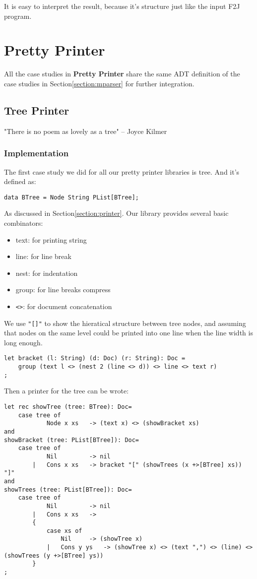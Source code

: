 It is easy to interpret the result, because it's structure just like the input F2J program.

\section{Pretty Printer}

All the case studies in \textbf{Pretty Printer} share the same ADT definition of the case studies in Section\ref{section:mparser} for further integration.

\subsection{Tree Printer}
"There is no poem as lovely as a tree" -- Joyce Kilmer
\subsubsection{Implementation}

The first case study we did for all our pretty printer libraries is tree. And it's defined as:

\begin{lstlisting}
data BTree = Node String PList[BTree];
\end{lstlisting}

As discussed in Section\ref{section:printer}. Our library provides several basic combinators:

\begin{itemize}
\item text:    for printing string
\item line:    for line break
\item nest:    for indentation
\item group:   for line breaks compress
\item \texttt{<>}:      for document concatenation
\end{itemize}

We use \texttt{"[]"} to show the hieratical structure between tree nodes, and assuming that nodes on the same level could be printed into one line when the line width is long enough.
\begin{lstlisting}
let bracket (l: String) (d: Doc) (r: String): Doc =
    group (text l <> (nest 2 (line <> d)) <> line <> text r)
;
\end{lstlisting}

Then a printer for the tree can be wrote:

\begin{lstlisting}
let rec showTree (tree: BTree): Doc=
    case tree of
            Node x xs   -> (text x) <> (showBracket xs)
and
showBracket (tree: PList[BTree]): Doc=
    case tree of
            Nil         -> nil
        |   Cons x xs   -> bracket "[" (showTrees (x +>[BTree] xs)) "]"
and
showTrees (tree: PList[BTree]): Doc=
    case tree of
            Nil         -> nil
        |   Cons x xs   ->
        {
            case xs of
                Nil     -> (showTree x)
            |   Cons y ys   -> (showTree x) <> (text ",") <> (line) <> (showTrees (y +>[BTree] ys))
        }
;
\end{lstlisting}

